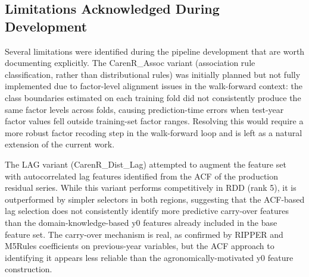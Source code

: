 \subsection{Limitations Acknowledged During Development}\label{sub:limitations_acknowledged_during_development}

Several limitations were identified during the pipeline development that are worth documenting explicitly. The CarenR\_Assoc variant (association rule classification, rather than distributional rules) was initially planned but not fully implemented due to factor-level alignment issues in the walk-forward context: the class boundaries estimated on each training fold did not consistently produce the same factor levels across folds, causing prediction-time errors when test-year factor values fell outside training-set factor ranges. Resolving this would require a more robust factor recoding step in the walk-forward loop and is left as a natural extension of the current work.

The LAG variant (CarenR\_Dist\_Lag) attempted to augment the feature set with autocorrelated lag features identified from the ACF of the production residual series. While this variant performs competitively in RDD (rank 5), it is outperformed by simpler selectors in both regions, suggesting that the ACF-based lag selection does not consistently identify more predictive carry-over features than the domain-knowledge-based y0 features already included in the base feature set. The carry-over mechanism is real, as confirmed by RIPPER and M5Rules coefficients on previous-year variables, but the ACF approach to identifying it appears less reliable than the agronomically-motivated y0 feature construction.
